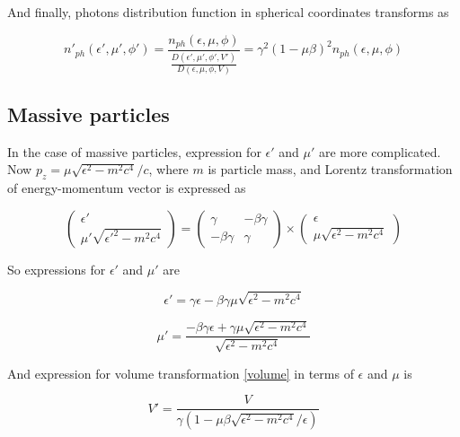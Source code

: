 And finally, photons distribution function in spherical coordinates transforms as

\begin{equation}\label{distribution_ph}
	n'_{ph}(\epsilon',\mu',\phi') = \frac{n_{ph}(\epsilon,\mu,\phi)}{\frac{D(\epsilon',\mu',\phi',V')}{D(\epsilon,\mu,\phi,V)}}=\gamma^2(1-\mu\beta)^2 n_{ph}(\epsilon,\mu,\phi)
\end{equation}

\subsection{Massive particles}
In the case of massive particles, expression for $\epsilon'$ and $\mu'$ are more complicated. Now $p_z = \mu \sqrt{\epsilon^2 - m^2 c^4}/c$, where $m$ is particle mass, and Lorentz transformation of energy-momentum vector is expressed as

\begin{equation}\label{lorentz_m}
	\left(\begin{array}{c}
		\epsilon'\\
		\mu'\sqrt{{\epsilon'}^2 - m^2 c^4}
	\end{array}
	\right)
	= \left(
	\begin{array}{cc}
		\gamma & -\beta\gamma\\
		-\beta\gamma & \gamma
	\end{array}
	\right)
	\times
	\left(\begin{array}{c}
		\epsilon\\
		\mu\sqrt{{\epsilon}^2-m^2 c^4}
	\end{array}
	\right)
\end{equation}

So expressions for $\epsilon'$ and $\mu'$ are

\begin{equation}
	\epsilon' = \gamma\epsilon-\beta\gamma\mu\sqrt{\epsilon^2-m^2 c^4}
\end{equation}

\begin{equation}
	\mu' = \frac{-\beta\gamma\epsilon+\gamma\mu\sqrt{{\epsilon}^2-m^2 c^4}}{\sqrt{{\epsilon^2 - m^2 c^4}}}
\end{equation}

And expression for volume transformation \ref{volume} in terms of $\epsilon$ and $\mu$ is

\begin{equation}
	V'=\frac{V}{\gamma(1-\mu\beta\sqrt{{\epsilon}^2-m^2 c^4}/\epsilon)}
\end{equation}

